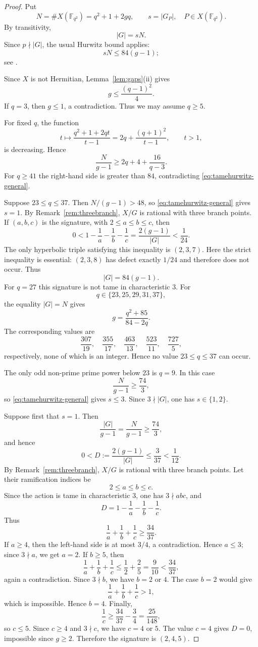 \documentclass[11pt]{amsart}
\theoremstyle{remark}
\newcommand{\F}{\mathbb F}
\begin{document}
\begin{proof}
Put
\[
N=\#X(\F_{q^2})=q^2+1+2gq,
\qquad
s=|G_P|,
\quad P\in X(\F_{q^2}).
\]
By transitivity,
\[
|G|=sN.
\]
Since $p\nmid|G|$, the usual Hurwitz bound applies:
\begin{equation}\label{eq:tamehurwitz-general}
sN\le84(g-1);
\end{equation}
see \cite[Theorem~11.56]{HKT}.

Since $X$ is not Hermitian, Lemma~\ref{lem:gaps}(ii) gives
\[
g\le\frac{(q-1)^2}{4}.
\]
If $q=3$, then $g\le1$, a contradiction. Thus we may assume
$q\ge5$.

For fixed $q$, the function
\[
t\longmapsto
\frac{q^2+1+2qt}{t-1}
=
2q+\frac{(q+1)^2}{t-1},
\qquad t>1,
\]
is decreasing. Hence
\begin{equation}\label{eq:ratio-general}
\frac{N}{g-1}
\ge
2q+4+\frac{16}{q-3}.
\end{equation}
For $q\ge41$ the right-hand side is greater than $84$, contradicting
\eqref{eq:tamehurwitz-general}.

Suppose $23\le q\le37$. Then $N/(g-1)>48$, so
\eqref{eq:tamehurwitz-general} gives $s=1$. By
Remark~\ref{rem:threebranch}, $X/G$ is rational with three branch
points. If $(a,b,c)$ is the signature, with
$2\le a\le b\le c$, then
\[
0<
1-\frac1a-\frac1b-\frac1c
=
\frac{2(g-1)}{|G|}
<
\frac1{24}.
\]
The only hyperbolic triple satisfying this inequality is $(2,3,7)$.
Here the strict inequality is essential: $(2,3,8)$ has defect exactly
$1/24$ and therefore does not occur. Thus
\[
|G|=84(g-1).
\]
For $q=27$ this signature is not tame in characteristic $3$.
For
\[
q\in\{23,25,29,31,37\},
\]
the equality $|G|=N$ gives
\[
g=\frac{q^2+85}{84-2q}.
\]
The corresponding values are
\[
\frac{307}{19},\quad
\frac{355}{17},\quad
\frac{463}{13},\quad
\frac{523}{11},\quad
\frac{727}{5},
\]
respectively, none of which is an integer. Hence no value
$23\le q\le37$ can occur.

The only odd non-prime prime power below $23$ is $q=9$. In this case
\[
\frac{N}{g-1}\ge\frac{74}{3},
\]
so \eqref{eq:tamehurwitz-general} gives $s\le3$. Since
$3\nmid|G|$, one has $s\in\{1,2\}$.

Suppose first that $s=1$. Then
\[
\frac{|G|}{g-1}
=
\frac{N}{g-1}
\ge
\frac{74}{3},
\]
and hence
\[
0<
D:=\frac{2(g-1)}{|G|}
\le
\frac{3}{37}
<
\frac1{12}.
\]
By Remark~\ref{rem:threebranch}, $X/G$ is rational with three branch
points. Let their ramification indices be
\[
2\le a\le b\le c.
\]
Since the action is tame in characteristic $3$, one has
$3\nmid abc$, and
\[
D=
1-\frac1a-\frac1b-\frac1c.
\]
Thus
\[
\frac1a+\frac1b+\frac1c
\ge
\frac{34}{37}.
\]
If $a\ge4$, then the left-hand side is at most $3/4$, a
contradiction. Hence $a\le3$; since $3\nmid a$, we get $a=2$. If $b\ge5$, then
\[
\frac1a+\frac1b+\frac1c
\le
\frac12+\frac25
=
\frac9{10}
<
\frac{34}{37},
\]
again a contradiction. Since $3\nmid b$, we have $b=2$ or $4$.
The case $b=2$ would give
\[
\frac1a+\frac1b+\frac1c>1,
\]
which is impossible. Hence $b=4$. Finally,
\[
\frac1c
\ge
\frac{34}{37}-\frac34
=
\frac{25}{148},
\]
so $c\le5$. Since $c\ge4$ and $3\nmid c$, we have
$c=4$ or $5$. The value $c=4$ gives $D=0$, impossible since
$g\ge2$. Therefore the signature is $(2,4,5)$.


\end{proof}
\end{document}
